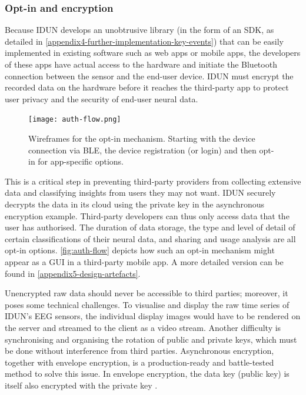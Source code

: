 \subsubsection{Opt-in and encryption}
\label{chapter5-opt-in-and-encryption}

Because IDUN develops an unobtrusive library (in the form of an SDK, as detailed in \autoref{appendix4-further-implementation-key-events}) that can be easily implemented in existing software such as web apps or mobile apps, the developers of these apps have actual access to the hardware and initiate the Bluetooth connection between the sensor and the end-user device. IDUN must encrypt the recorded data on the hardware before it reaches the third-party app to protect user privacy and the security of end-user neural data.

\begin{figure}[!ht]
  \centering
  \texttt{[image: auth-flow.png]}
  \caption{Wireframes for the opt-in mechanism. Starting with the device connection via BLE, the device registration (or login) and then opt-in for app-specific options.}
  \label{fig:auth-flow}
\end{figure}

This is a critical step in preventing third-party providers from collecting extensive data and classifying insights from users they may not want. IDUN securely decrypts the data in its cloud using the private key in the asynchronous encryption example. Third-party developers can thus only access data that the user has authorised. The duration of data storage, the type and level of detail of certain classifications of their neural data, and sharing and usage analysis are all opt-in options. \autoref{fig:auth-flow} depicts how such an opt-in mechanism might appear as a GUI in a third-party mobile app. A more detailed version can be found in \autoref{appendix5-design-artefacts}.

Unencrypted raw data should never be accessible to third parties; moreover, it poses some technical challenges. To visualise and display the raw time series of IDUN’s EEG sensors, the individual display images would have to be rendered on the server and streamed to the client as a video stream. Another difficulty is synchronising and organising the rotation of public and private keys, which must be done without interference from third parties. Asynchronous encryption, together with envelope encryption, is a production-ready and battle-tested method to solve this issue. In envelope encryption, the data key (public key) is itself also encrypted with the private key \citep{google_cloud_envelope_nodate}.

